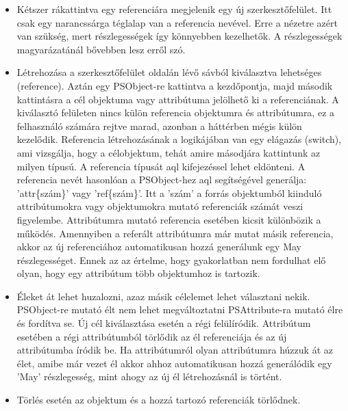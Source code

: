 \begin{itemize}  	
	\item Kétszer rákattintva egy referenciára megjelenik egy új szerkesztőfelület. Itt csak egy narancssárga téglalap van a referencia nevével. Erre a nézetre azért van szükség, mert részlegességek így könnyebben kezelhetők. A részlegességek magyarázatánál bővebben lesz erről szó.
	
	\item Létrehozása a szerkesztőfelület oldalán lévő sávból kiválasztva lehetséges (reference). Aztán egy PSObject-re kattintva a kezdőpontja, majd második kattintásra a cél objektuma vagy attribútuma jelölhető ki a referenciának. A kiválasztó felületen nincs külön referencia objektumra és attribútumra, ez a felhasználó számára rejtve marad, azonban a háttérben mégis külön kezelődik. Referencia létrehozásának a logikájában van egy elágazás (switch), ami vizsgálja, hogy a célobjektum, tehát amire másodjára kattintunk az milyen típusú. A referencia típusát aql kifejezéssel lehet eldönteni. A referencia nevét hasonlóan a PSObject-hez aql segítségével generálja: 'attr\{szám\}' vagy 'ref\{szám\}'. Itt a 'szám' a forrás objektumból kiinduló attribútumokra vagy objektumokra mutató referenciák számát veszi figyelembe. Attribútumra mutató referencia esetében kicsit különbözik a működés. Amennyiben a referált attribútumra már mutat másik referencia, akkor az új referenciához automatikusan hozzá generálunk egy May részlegességet. Ennek az az értelme, hogy gyakorlatban nem fordulhat elő olyan, hogy egy attribútum több objektumhoz is tartozik.
	
	\item Éleket át lehet huzalozni, azaz másik célelemet lehet választani nekik. PSObject-re mutató élt nem lehet megváltoztatni PSAttribute-ra mutató élre és fordítva se. Új cél kiválasztása esetén a régi felülíródik. Attribútum esetében a régi attribútumból törlődik az él referenciája és az új attribútumba íródik be. Ha attribútumról olyan attribútumra húzzuk át az élet, amibe már vezet él akkor ahhoz  automatikusan hozzá generálódik egy 'May' részlegesség, mint ahogy az új él létrehozásnál is történt.
	
	\item Törlés esetén az objektum és a hozzá tartozó referenciák törlődnek.
\end{itemize}


